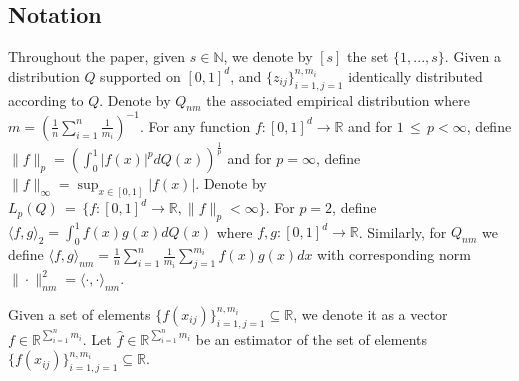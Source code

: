 \documentclass[twoside,11pt]{article}
\begin{document}



 

\subsection{Notation}

Throughout the paper, given $s \in \mathbb{N}$, we denote by $[s]$ the set $\{1, . . . , s\}$. Given a distribution $Q$ supported on $[0, 1]^d$, and $\{z_{ij}\}_{i=1,j=1}^{n,m_i}$ identically distributed according to $Q$. Denote by $Q_{nm}$ the associated empirical distribution where $m = \left( \frac{1}{n} \sum_{i=1}^n \frac{1}{m_i} \right)^{-1}$. For any function $f : [0,1]^d \to \mathbb{R}$ and for $1 \,\leq\, p < \infty$, define $\|f\|_p = \left( \int_0^1 |f(x)|^p dQ(x) \right)^{\frac{1}{p}}$ and for $p = \infty$, define $\|f\|_\infty = \sup_{x\in[0,1]} |f(x)|$. Denote by $L_p(Q) \,=\, \{ f : [0, 1]^d \to \mathbb{R}, \|f\|_p < \infty \}$. For $p = 2$, define $\langle f,g \rangle_2 = \int_0^1 f(x)g(x)dQ(x)$ where $f, g : [0, 1]^d \to \mathbb{R}$. Similarly, for $Q_{nm}$ we define $\langle f,g\rangle_{nm} = \frac{1}{n} \sum_{i=1}^n \frac{1}{m_i} \sum_{j=1}^{m_i} f(x)g(x)dx$ with corresponding norm $\| \cdot \|_{nm}^2 = \langle \cdot,\cdot \rangle_{nm}$. 


Given a set of elements $\{ f(x_{ij}) \}_{i=1,j=1}^{n,m_i} \subseteq \mathbb{R}$, 
we denote it as a vector $f \in \mathbb{R}^{\sum_{i=1}^n m_i}$. 
Let $\hat{f} \in \mathbb{R}^{\sum_{i=1}^n m_i}$ be an estimator of the set of elements $\{ f(x_{ij}) \}_{i=1,j=1}^{n,m_i} \subseteq \mathbb{R}$.  
\end{document}
